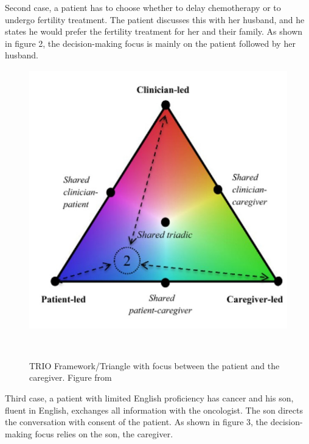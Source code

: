 \documentclass{sigchi}
\begin{document}
Second case, a patient has to choose whether to delay chemotherapy or to undergo fertility treatment. The patient discusses this with her husband, and he states he would prefer the fertility treatment for her and their family. As shown in figure 2, the decision-making focus is mainly on the patient followed by her husband.

\begin{figure}[H]
\centering
  \includegraphics[width=0.9\columnwidth]{figures/Triangle2Screenshotjpg.jpg}
  \caption{TRIO Framework/Triangle with focus between the patient and the caregiver. Figure from}~\label{fig:figure1}
\end{figure}

Third case, a patient with limited English proficiency has cancer and his son, fluent in English, exchanges all information with the oncologist. The son directs the conversation with consent of the patient. As shown in figure 3, the decision-making focus relies on the son, the caregiver.
\end{document}
